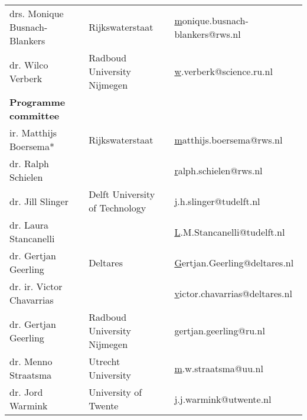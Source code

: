\begin{longtable}{lll}
drs. Monique Busnach-Blankers          & Rijkswaterstaat                                       & {\color[HTML]{0563C1} {\ul monique.busnach-blankers@rws.nl}} \\
\rowcolor[HTML]{C9D6D6} 
dr. Wilco Verberk                      & Radboud University   Nijmegen                         & {\color[HTML]{0563C1} {\ul w.verberk@science.ru.nl}}         \\
\rowcolor[HTML]{B9C6D5} 
\textbf{Programme committee}           &                                                       &                                                              \\
\rowcolor[HTML]{C9D6D6} 
ir. Matthijs Boersema*                 & Rijkswaterstaat                                       & {\color[HTML]{0563C1} {\ul matthijs.boersema@rws.nl}}        \\
\rowcolor[HTML]{B9C6D5} 
dr. Ralph Schielen                     &                                                       & {\color[HTML]{0563C1} {\ul ralph.schielen@rws.nl}}           \\
\rowcolor[HTML]{C9D6D6} 
dr. Jill Slinger                       & Delft University of   Technology                      & {\color[HTML]{0563C1} {\ul j.h.slinger@tudelft.nl}}          \\
\rowcolor[HTML]{B9C6D5} 
dr. Laura Stancanelli                  &                                                       & {\color[HTML]{0563C1} {\ul L.M.Stancanelli@tudelft.nl}}      \\
\rowcolor[HTML]{C9D6D6} 
dr. Gertjan Geerling                   & Deltares                                              & {\color[HTML]{0563C1} {\ul Gertjan.Geerling@deltares.nl}}    \\
\rowcolor[HTML]{B9C6D5} 
dr. ir. Victor Chavarrias                  &                                                       & {\color[HTML]{0563C1} {\ul victor.chavarrias@deltares.nl}}   \\
\rowcolor[HTML]{C9D6D6} 
dr. Gertjan Geerling                   & Radboud University   Nijmegen                         & {\color[HTML]{0563C1} {\ul gertjan.geerling@ru.nl}}          \\
\rowcolor[HTML]{B9C6D5} 
dr. Menno Straatsma                    & Utrecht University                                    & {\color[HTML]{0563C1} {\ul m.w.straatsma@uu.nl}}             \\
\rowcolor[HTML]{C9D6D6} 
dr. Jord Warmink                       & University of Twente                                  & {\color[HTML]{0563C1} {\ul j.j.warmink@utwente.nl}}          \\

\end{longtable}
